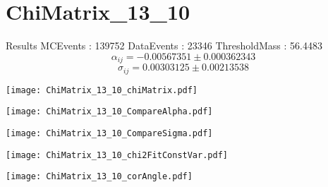 \documentclass[a4paper,12pt]{article}
\begin{document}
\section{ChiMatrix\_13\_10}
\begin{minipage}{0.49\linewidth} Results \newline
MCEvents : 139752\newline
DataEvents : 23346 \newline
ThresholdMass : 56.4483\\
$$\alpha_{ij} = -0.00567351\pm 0.000362343$$
$$\sigma_{ij} = 0.00303125\pm 0.00213538$$
\end{minipage}\hfill
\begin{minipage}{0.49\linewidth} 
\texttt{[image: ChiMatrix\_13\_10\_chiMatrix.pdf]}\\
\end{minipage}
\hfill
\begin{minipage}{0.49\linewidth} 
\texttt{[image: ChiMatrix\_13\_10\_CompareAlpha.pdf]}\\
\end{minipage}
\hfill
\begin{minipage}{0.49\linewidth} 
\texttt{[image: ChiMatrix\_13\_10\_CompareSigma.pdf]}\\
\end{minipage}
\begin{minipage}{0.49\linewidth} 
\texttt{[image: ChiMatrix\_13\_10\_chi2FitConstVar.pdf]}\\
\end{minipage}
\hfill
\begin{minipage}{0.49\linewidth} 
\texttt{[image: ChiMatrix\_13\_10\_corAngle.pdf]}\\
\end{minipage}
\end{document}
